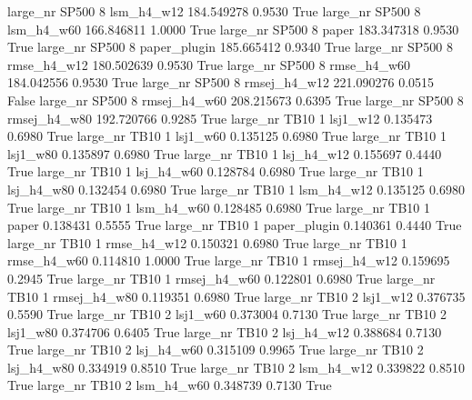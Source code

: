   large_nr    SP500                 8   lsm_h4_w12  184.549278      0.9530    True
  large_nr    SP500                 8   lsm_h4_w60  166.846811      1.0000    True
  large_nr    SP500                 8        paper  183.347318      0.9530    True
  large_nr    SP500                 8 paper_plugin  185.665412      0.9340    True
  large_nr    SP500                 8  rmse_h4_w12  180.502639      0.9530    True
  large_nr    SP500                 8  rmse_h4_w60  184.042556      0.9530    True
  large_nr    SP500                 8 rmsej_h4_w12  221.090276      0.0515   False
  large_nr    SP500                 8 rmsej_h4_w60  208.215673      0.6395    True
  large_nr    SP500                 8 rmsej_h4_w80  192.720766      0.9285    True
  large_nr     TB10                 1     lsj1_w12    0.135473      0.6980    True
  large_nr     TB10                 1     lsj1_w60    0.135125      0.6980    True
  large_nr     TB10                 1     lsj1_w80    0.135897      0.6980    True
  large_nr     TB10                 1   lsj_h4_w12    0.155697      0.4440    True
  large_nr     TB10                 1   lsj_h4_w60    0.128784      0.6980    True
  large_nr     TB10                 1   lsj_h4_w80    0.132454      0.6980    True
  large_nr     TB10                 1   lsm_h4_w12    0.135125      0.6980    True
  large_nr     TB10                 1   lsm_h4_w60    0.128485      0.6980    True
  large_nr     TB10                 1        paper    0.138431      0.5555    True
  large_nr     TB10                 1 paper_plugin    0.140361      0.4440    True
  large_nr     TB10                 1  rmse_h4_w12    0.150321      0.6980    True
  large_nr     TB10                 1  rmse_h4_w60    0.114810      1.0000    True
  large_nr     TB10                 1 rmsej_h4_w12    0.159695      0.2945    True
  large_nr     TB10                 1 rmsej_h4_w60    0.122801      0.6980    True
  large_nr     TB10                 1 rmsej_h4_w80    0.119351      0.6980    True
  large_nr     TB10                 2     lsj1_w12    0.376735      0.5590    True
  large_nr     TB10                 2     lsj1_w60    0.373004      0.7130    True
  large_nr     TB10                 2     lsj1_w80    0.374706      0.6405    True
  large_nr     TB10                 2   lsj_h4_w12    0.388684      0.7130    True
  large_nr     TB10                 2   lsj_h4_w60    0.315109      0.9965    True
  large_nr     TB10                 2   lsj_h4_w80    0.334919      0.8510    True
  large_nr     TB10                 2   lsm_h4_w12    0.339822      0.8510    True
  large_nr     TB10                 2   lsm_h4_w60    0.348739      0.7130    True
